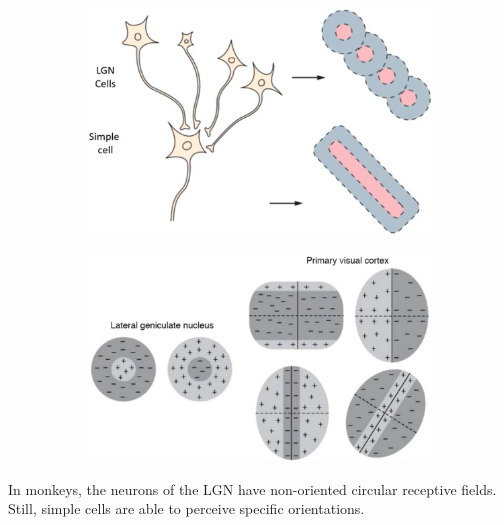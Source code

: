\begin{figure}[H]
    \centering
    \begin{subfigure}{0.45\linewidth}
        \centering
        \includegraphics[width=0.9\linewidth]{./img/v1_simple_cell.png}
    \end{subfigure}
    \begin{subfigure}{0.45\linewidth}
        \centering
        \includegraphics[width=0.9\linewidth]{./img/v1_simple_cells_visual.png}
    \end{subfigure}
\end{figure}

\begin{casestudy}
    In monkeys, the neurons of the LGN have non-oriented circular receptive fields.
    Still, simple cells are able to perceive specific orientations.
\end{casestudy}

